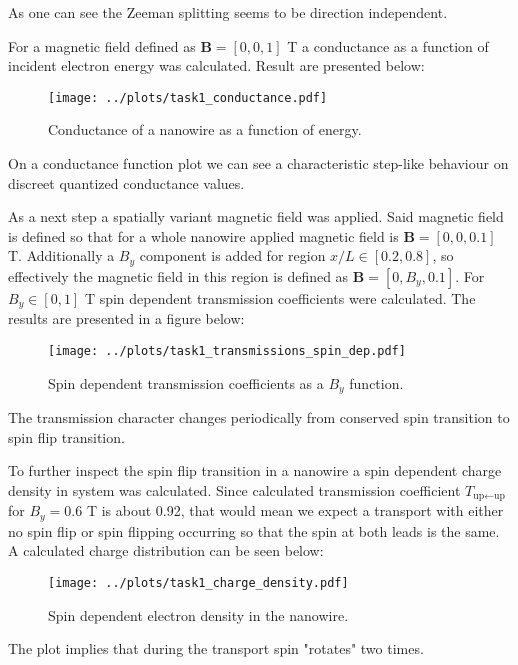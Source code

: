 \documentclass[12pt,a4]{article}
\begin{document}
As one can see the Zeeman splitting seems to be direction independent.

For a magnetic field defined as $\mathbf{B} = [0, 0, 1] $ T a conductance as a function of incident electron energy was calculated. Result are presented below:

\begin{figure}[H]
	\centering
	\texttt{[image: ../plots/task1\_conductance.pdf]}
	\caption{Conductance of a nanowire as a function of energy.}
\end{figure}

On a conductance function plot we can see a characteristic step-like behaviour on discreet quantized conductance values.

As a next step a spatially variant magnetic field was applied. Said magnetic field is defined so that for a whole nanowire applied magnetic field is $\mathbf{B} = [0,0,0.1]$ T. Additionally a $B_y$ component is added for region $x/L\in[0.2, 0.8]$, so effectively the magnetic field in this region is defined as $\mathbf{B} = [ 0, B_y , 0.1]$. For $B_y \in  [0,1]$ T spin dependent transmission coefficients were calculated. The results are presented in a figure below:

\begin{figure}[H]
	\centering
	\texttt{[image: ../plots/task1\_transmissions\_spin\_dep.pdf]}
	\caption{Spin dependent transmission coefficients as a $B_y$ function.}
\end{figure}

The transmission character changes periodically from conserved spin transition to spin flip transition. 

To further inspect the spin flip transition in a nanowire a spin dependent charge density in system was calculated. Since calculated transmission coefficient $T_{\text{up}\leftarrow\text{up}}$ for $B_y = 0.6$ T is about 0.92, that would mean we expect a transport with either no spin flip or spin flipping occurring so that the spin at both leads is the same. A calculated charge distribution can be seen below:

\begin{figure}[H]
	\centering
	\texttt{[image: ../plots/task1\_charge\_density.pdf]}
	\caption{Spin dependent electron density in the nanowire.}
\end{figure}

The plot implies that during the transport spin "rotates" two times.
\end{document}
